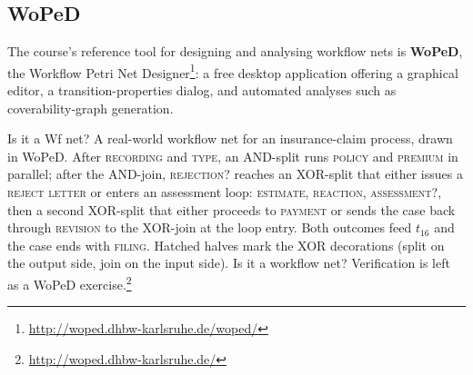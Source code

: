 \subsection{WoPeD}

The course's reference tool for designing and analysing workflow nets is \textbf{WoPeD}, the Workflow Petri Net Designer\footnote{\url{http://woped.dhbw-karlsruhe.de/woped/}}: a free desktop application offering a graphical editor, a transition-properties dialog, and automated analyses such as coverability-graph generation.

\begin{examplebox}{Is it a Wf net?}
A real-world workflow net for an insurance-claim process, drawn in WoPeD. After \textsc{recording} and \textsc{type}, an AND-split runs \textsc{policy} and \textsc{premium} in parallel; after the AND-join, \textsc{rejection?} reaches an XOR-split that either issues a \textsc{reject letter} or enters an assessment loop: \textsc{estimate}, \textsc{reaction}, \textsc{assessment?}, then a second XOR-split that either proceeds to \textsc{payment} or sends the case back through \textsc{revision} to the XOR-join at the loop entry. Both outcomes feed $t_{16}$ and the case ends with \textsc{filing}. Hatched halves mark the XOR decorations (split on the output side, join on the input side). Is it a workflow net? Verification is left as a WoPeD exercise.\footnote{\url{http://woped.dhbw-karlsruhe.de/}}


\end{examplebox}
